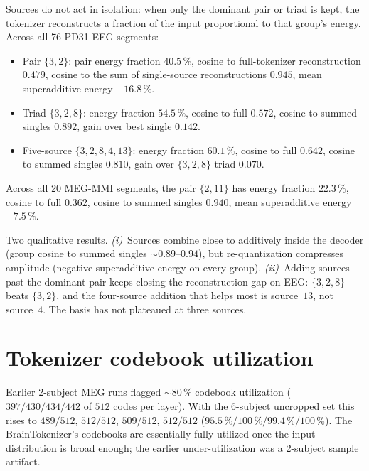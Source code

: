 \documentclass[11pt]{article}
\begin{document}
Sources do not act in isolation: when only the dominant pair or triad is kept,
the tokenizer reconstructs a fraction of the input proportional to that
group's energy. Across all 76 PD31 EEG segments:
\begin{itemize}
\item Pair $\{3,2\}$: pair energy fraction $40.5\,\%$, cosine to full-tokenizer
reconstruction $0.479$, cosine to the sum of single-source reconstructions
$0.945$, mean superadditive energy $-16.8\,\%$.
\item Triad $\{3, 2, 8\}$: energy fraction $54.5\,\%$, cosine to full $0.572$,
cosine to summed singles $0.892$, gain over best single $0.142$.
\item Five-source $\{3, 2, 8, 4, 13\}$: energy fraction $60.1\,\%$, cosine to
full $0.642$, cosine to summed singles $0.810$, gain over $\{3,2,8\}$ triad
$0.070$.
\end{itemize}
Across all 20 MEG-MMI segments, the pair $\{2, 11\}$ has energy fraction
$22.3\,\%$, cosine to full $0.362$, cosine to summed singles $0.940$, mean
superadditive energy $-7.5\,\%$.

Two qualitative results. \emph{(i)}~Sources combine close to additively
inside the decoder (group cosine to summed singles $\sim 0.89$--$0.94$), but
re-quantization compresses amplitude (negative superadditive energy on every
group). \emph{(ii)}~Adding sources past the dominant pair keeps closing the
reconstruction gap on EEG: $\{3,2,8\}$ beats $\{3,2\}$, and the four-source
addition that helps most is source~$13$, not source~$4$. The basis has not
plateaued at three sources.

\section{Tokenizer codebook utilization}\label{sec:codebook}

Earlier 2-subject MEG runs flagged $\sim 80\,\%$ codebook utilization
($397/430/434/442$ of $512$ codes per layer). With the 6-subject uncropped
set this rises to $489/512$, $512/512$, $509/512$, $512/512$
($95.5\,\%/100\,\%/99.4\,\%/100\,\%$). The BrainTokenizer's codebooks are
essentially fully utilized once the input distribution is broad enough; the
earlier under-utilization was a 2-subject sample artifact.

\end{document}
